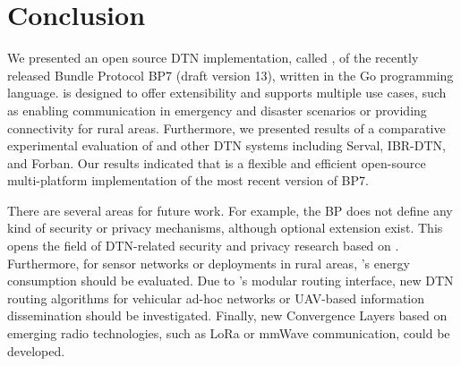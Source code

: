 \section{Conclusion}
\label{penning2019dtn7:sec:conclusion}
We presented an open source DTN implementation, called \dtn, of the recently released Bundle Protocol BP7 (draft version 13), written in the Go programming language.
\dtn is designed to offer extensibility and supports multiple use cases, such as enabling communication in emergency and disaster scenarios or providing connectivity for rural areas.
Furthermore, we presented results of a comparative experimental evaluation of \dtn and other DTN systems including Serval, IBR-DTN, and Forban.
Our results indicated that \dtn is a flexible and efficient open-source multi-platform implementation of the most recent version of BP7.

There are several areas for future work.
For example, the BP does not define any kind of security or privacy mechanisms, although optional extension exist.
This opens the field of DTN-related security and privacy research based on \dtn.
Furthermore, for sensor networks or deployments in rural areas, \dtn's energy consumption should be evaluated.
Due to \dtn's modular routing interface, new DTN routing algorithms for vehicular ad-hoc networks or UAV-based information dissemination should be investigated.
Finally, new Convergence Layers based on emerging radio technologies, such as LoRa or mmWave communication, could be developed.
